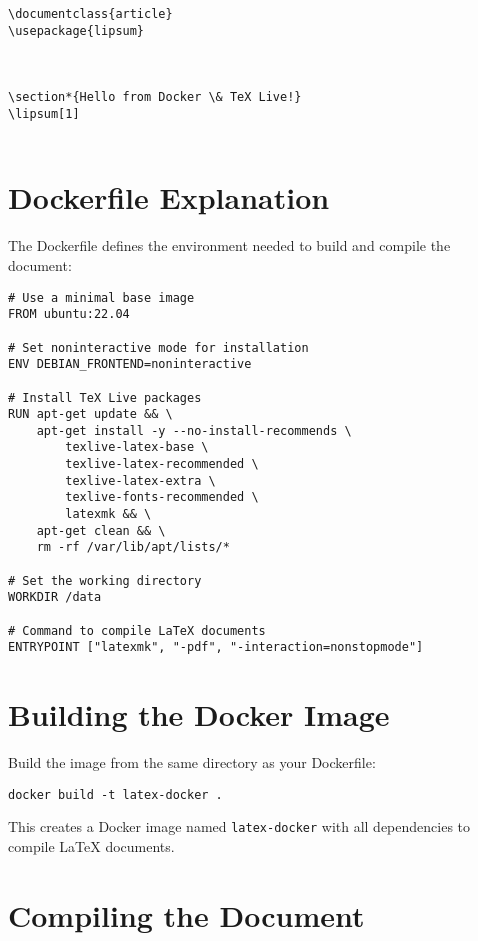 \begin{verbatim}
\documentclass{article}
\usepackage{lipsum}



\section*{Hello from Docker \& TeX Live!}
\lipsum[1]


\end{verbatim}

\section{Dockerfile Explanation}

The Dockerfile defines the environment needed to build and compile the document:

\begin{verbatim}
# Use a minimal base image
FROM ubuntu:22.04

# Set noninteractive mode for installation
ENV DEBIAN_FRONTEND=noninteractive

# Install TeX Live packages
RUN apt-get update && \
    apt-get install -y --no-install-recommends \
        texlive-latex-base \
        texlive-latex-recommended \
        texlive-latex-extra \
        texlive-fonts-recommended \
        latexmk && \
    apt-get clean && \
    rm -rf /var/lib/apt/lists/*

# Set the working directory
WORKDIR /data

# Command to compile LaTeX documents
ENTRYPOINT ["latexmk", "-pdf", "-interaction=nonstopmode"]
\end{verbatim}

\section{Building the Docker Image}

Build the image from the same directory as your Dockerfile:

\begin{verbatim}
docker build -t latex-docker .
\end{verbatim}

This creates a Docker image named \texttt{latex-docker} with all dependencies to compile \LaTeX{} documents.

\section{Compiling the Document}

